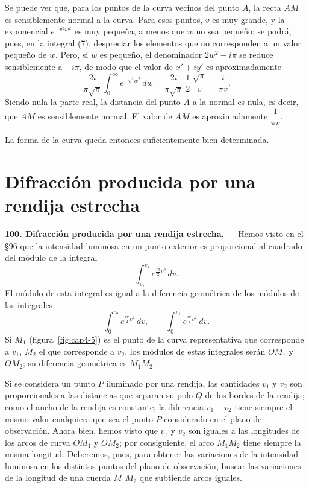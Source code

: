 Se puede ver que, para los puntos de la curva vecinos del punto $A$, la
recta $AM$ es sensiblemente normal a la curva. Para esos puntos, $v$ es
muy grande, y la exponencial $e^{-v^2w^2}$ es muy pequeña, a menos que
$w$ no sea pequeño; se podrá, pues, en la integral (7), despreciar los
elementos que no corresponden a un valor pequeño de $w$. Pero, si $w$ es
pequeño, el denominador $2w^2-i\pi$ se reduce sensiblemente a $-i\pi$, de
modo que el valor de $x'+iy'$ es aproximadamente
\[
\frac{2i}{\pi\sqrt\pi}\int_0^\infty e^{-v^2w^2}\,dw =
\frac{2i}{\pi\sqrt\pi}\,\frac12\,\frac{\sqrt\pi}{v} = \frac{i}{\pi v}.
\]
Siendo nula la parte real, la distancia del punto $A$ a la normal es
nula, es decir, que $AM$ es sensiblemente normal. El valor de $AM$ es
aproximadamente $\dfrac{1}{\pi v}$.

La forma de la curva queda entonces suficientemente bien determinada.

\section{Difracción producida por una rendija estrecha}

\noindent\textbf{100. Difracción producida por una rendija estrecha.} —
Hemos visto en el §96 que la intensidad luminosa en un punto exterior es
proporcional al cuadrado del módulo de la integral
\[
\int_{v_1}^{v_2} e^{\frac{i\pi}{2}v^2}\,dv.
\]
El módulo de esta integral es igual a la diferencia geométrica de los
módulos de las integrales
\[
\int_0^{v_2} e^{\frac{i\pi}{2}v^2}\,dv,\qquad
\int_0^{v_1} e^{\frac{i\pi}{2}v^2}\,dv.
\]
Si $M_1$ (figura~\ref{fig:cap4-5}) es el punto de la curva representativa
que corresponde a $v_1$, $M_2$ el que corresponde a $v_2$, los módulos de
estas integrales serán $OM_1$ y $OM_2$; su diferencia geométrica es
$M_1M_2$.

Si se considera un punto $P$ iluminado por una rendija, las cantidades
$v_1$ y $v_2$ son proporcionales a las distancias que separan su polo $Q$
de los bordes de la rendija; como el ancho de la rendija es constante, la
diferencia $v_1-v_2$ tiene siempre el mismo valor cualquiera que sea el
punto $P$ considerado en el plano de observación. Ahora bien, hemos visto
que $v_1$ y $v_2$ son iguales a las longitudes de los arcos de curva
$OM_1$ y $OM_2$; por consiguiente, el arco $M_1M_2$ tiene siempre la misma
longitud. Deberemos, pues, para obtener las variaciones de la intensidad
luminosa en los distintos puntos del plano de observación, buscar las
variaciones de la longitud de una cuerda $M_1M_2$ que subtiende arcos
iguales.


